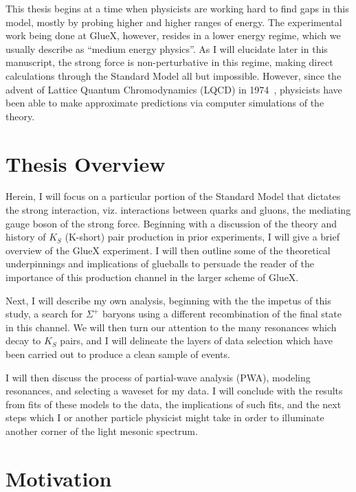 This thesis begins at a time when physicists are working hard to find gaps in this model, mostly by probing higher and higher ranges of energy. The experimental work being done at GlueX, however, resides in a lower energy regime, which we usually describe as ``medium energy physics''. As I will elucidate later in this manuscript, the strong force is non-perturbative in this regime, making direct calculations through the Standard Model all but impossible. However, since the advent of Lattice Quantum Chromodynamics (LQCD) in 1974~\cite{wilson_confinement_1974}, physicists have been able to make approximate predictions via computer simulations of the theory.

\section{Thesis Overview}\label{sec:thesis_overview}

Herein, I will focus on a particular portion of the Standard Model that dictates the strong interaction, viz. interactions between quarks and gluons, the mediating gauge boson of the strong force. Beginning with a discussion of the theory and history of $K_S$ (K-short) pair production in prior experiments, I will give a brief overview of the GlueX experiment. I will then outline some of the theoretical underpinnings and implications of glueballs to persuade the reader of the importance of this production channel in the larger scheme of GlueX.

Next, I will describe my own analysis, beginning with the the impetus of this study, a search for $\Sigma^+$ baryons using a different recombination of the final state in this channel. We will then turn our attention to the many resonances which decay to $K_S$ pairs, and I will delineate the layers of data selection which have been carried out to produce a clean sample of events.

I will then discuss the process of partial-wave analysis (PWA), modeling resonances, and selecting a waveset for my data. I will conclude with the results from fits of these models to the data, the implications of such fits, and the next steps which I or another particle physicist might take in order to illuminate another corner of the light mesonic spectrum.

\section{Motivation}\label{sec:motivation}

